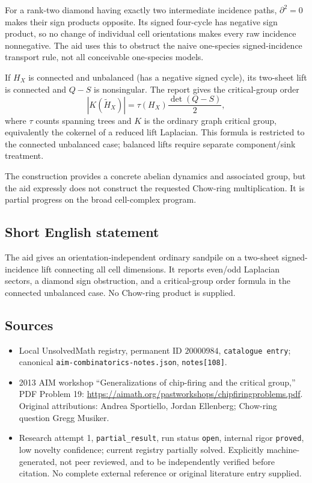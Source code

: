 \documentclass[11pt]{article}
\begin{document}
For a rank-two diamond having exactly two intermediate incidence paths, $\partial^2=0$ makes their sign products opposite. Its signed four-cycle has negative sign product, so no change of individual cell orientations makes every raw incidence nonnegative. The aid uses this to obstruct the naive one-species signed-incidence transport rule, not all conceivable one-species models.

If $H_X$ is connected and unbalanced (has a negative signed cycle), its two-sheet lift is connected and $Q-S$ is nonsingular. The report gives the critical-group order
\[
 |K(\widetilde H_X)|=\tau(H_X)\frac{\det(Q-S)}2,
\]
where $\tau$ counts spanning trees and $K$ is the ordinary graph critical group, equivalently the cokernel of a reduced lift Laplacian. This formula is restricted to the connected unbalanced case; balanced lifts require separate component/sink treatment.

The construction provides a concrete abelian dynamics and associated group, but the aid expressly does not construct the requested Chow-ring multiplication. It is partial progress on the broad cell-complex program.
\subsection{Short English statement}
The aid gives an orientation-independent ordinary sandpile on a two-sheet signed-incidence lift connecting all cell dimensions. It reports even/odd Laplacian sectors, a diamond sign obstruction, and a critical-group order formula in the connected unbalanced case. No Chow-ring product is supplied.
\subsection{Sources}
\begin{itemize}
\item Local UnsolvedMath registry, permanent ID $20000984$, \texttt{catalogue entry}; canonical \texttt{aim-combinatorics-notes.json}, \texttt{notes[108]}.
\item 2013 AIM workshop ``Generalizations of chip-firing and the critical group,'' PDF Problem 19: \url{https://aimath.org/pastworkshops/chipfiringproblems.pdf}. Original attributions: Andrea Sportiello, Jordan Ellenberg; Chow-ring question Gregg Musiker.
\item Research attempt 1, \texttt{partial\_result}, run status \texttt{open}, internal rigor \texttt{proved}, low novelty confidence; current registry partially solved. Explicitly machine-generated, not peer reviewed, and to be independently verified before citation. No complete external reference or original literature entry supplied.
\end{itemize}
\end{document}
